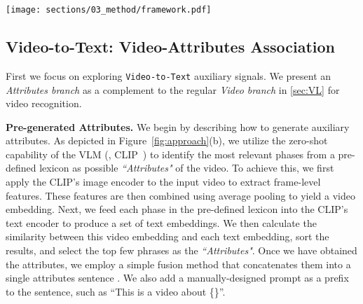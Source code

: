 \documentclass[10pt,twocolumn,letterpaper]{article}
\begin{document}
\begin{figure*}[t]
\begin{center}
\texttt{[image: sections/03\_method/framework.pdf]}
\end{center}
\vspace{-1em}
\caption{An overview of our \textbf{BIKE} for video recognition. (a) \textbf{BIKE} explores bidirectional cross-modal knowledge from the pre-trained vision-language model (\eg, CLIP) to introduce auxiliary attributes and category-dependent temporal saliency for improved video recognition. \textbf{BIKE} comprises an auxiliary \emph{Attributes branch} and a main \emph{Video branch}.
(b) In the \texttt{Video-to-Text} direction, we present the \textbf{Video-Attribute Association} mechanism, which retrieves semantically relevant phrases from a pre-defined lexicon as video attributes for the input video. These attributes are concatenated and combined with a textual prefix to form an attribute sentence for text recognition.
(c) In the \texttt{Text-to-Video} direction, we present the \textbf{Video Concept Spotting} mechanism, which computes the similarity between video frames and a given category as a measure of temporal saliency to enhance video representation.
 is the dimension of embedding,  is the number of frames, and  is the number of words in the category name.
}
\label{fig:approach}
\end{figure*}






\subsection{Video-to-Text: Video-Attributes Association }
\label{sec:VAL}
First we focus on exploring \texttt{Video-to-Text} auxiliary signals. We present an \emph{Attributes branch} as a complement to the regular \emph{Video branch} in \cref{sec:VL} for video recognition.



\noindent\textbf{Pre-generated Attributes.}
We begin by describing how to generate auxiliary attributes. As depicted in Figure~\ref{fig:approach}(b), we utilize the zero-shot capability of the VLM (\eg, CLIP~\cite{CLIP}) to identify the most relevant phases from a pre-defined lexicon as possible \emph{``Attributes"} of the video.
To achieve this, we first apply the CLIP's image encoder to the input video  to extract frame-level features. These features are then combined using average pooling to yield a video embedding. Next, we feed each phase in the pre-defined lexicon into the CLIP's text encoder to produce a set of text embeddings.
We then calculate the similarity between this video embedding and each text embedding, sort the results, and select the top few phrases as the \emph{``Attributes"}. 
Once we have obtained the attributes, we employ a simple fusion method that concatenates them into a single attributes sentence . We also add a manually-designed prompt as a prefix to the sentence, such as ``This is a video about \{\}''. 
\end{document}
